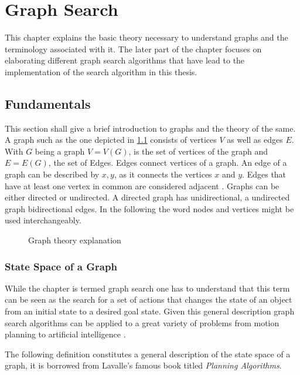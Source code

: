 \chapter{Graph Search}\label{chp:graphSearch}
This chapter explains the basic theory necessary to understand graphs and the terminology associated with it. The later part of the chapter focuses on elaborating different graph search algorithms that have lead to the implementation of the search algorithm in this thesis.

\section{Fundamentals}

This section shall give a brief introduction to graphs and the theory of the same. A graph such as the one depicted in \ref{fig:Graph} consists of vertices $V$ as well as edges $E$. With $G$ being a graph $V = V(G)$, is the set of vertices of the graph and $E = E(G)$, the set of Edges. Edges connect vertices of a graph. An edge of a graph can be described by ${x,y}$, as it connects the vertices $x$ and $y$. Edges that have at least one vertex in common are considered adjacent \cite{Bollobas.1979}. Graphs can be either directed or undirected. A directed graph has unidirectional, a undirected graph bidirectional edges. In the following the word nodes and vertices might be used interchangeably.

\begin{figure}[h]
    \caption{Graph theory explanation}
    \label{fig:Graph}
\end{figure}

\subsection{State Space of a Graph}
While the chapter is termed graph search one has to understand that this term can be seen as the search for a set of actions that changes the state of an object from an initial state to a desired goal state. Given this general description graph search algorithms can be applied to a great variety of problems from motion planning to artificial intelligence \cite{LaValle.2006}.

The following definition constitutes a general description of the state space of a graph, it is borrowed from Lavalle's famous book titled \emph{Planning Algorithms}. 

